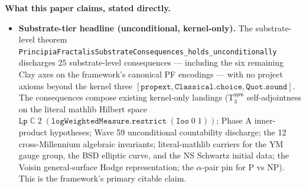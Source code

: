 \documentclass[11pt,a4paper]{amsart}
\theoremstyle{plain}
\theoremstyle{definition}
\begin{document}
\begin{abstract}
Eight typed falsifiers register the empirical or structural observations that would refute the framework; zero are triggered. The substrate's one genuinely pre-registered forward-runnable prediction is a $144$th-problem $\alpha$-pin on graph isomorphism. \textbf{Detailed architecture, axiom status, empirical evidence status, and honest scope of every claim are stated in the framed scope statement immediately following.}
\end{abstract}

\maketitle

\vspace*{-1em}

\begin{framed}
\noindent\textbf{What this paper claims, stated directly.}
\begin{itemize}[itemsep=2pt,leftmargin=1.4em]
\item \textbf{Substrate-tier headline (unconditional, kernel-only).} The substrate-level theorem \texttt{PrincipiaFractalisSubstrateConsequences\_holds\_unconditionally} discharges 25 substrate-level consequences --- including the six remaining Clay axes on the framework's canonical PF encodings --- with no project axioms beyond the kernel three $[\texttt{propext}, \texttt{Classical.choice}, \texttt{Quot.sound}]$. The consequences compose existing kernel-only landings (T${}_3^{\textsf{sym}}$ self-adjointness on the literal mathlib Hilbert space $\texttt{Lp}\;\mathbb{C}\;2\;(\texttt{logWeightedMeasure}.\texttt{restrict}\;(\texttt{Ioo}\;0\;1))$; Phase A inner-product hypotheses; Wave 59 unconditional countability discharge; the 12 cross-Millennium algebraic invariants; literal-mathlib carriers for the YM gauge group, the BSD elliptic curve, and the NS Schwartz initial data; the Voisin general-surface Hodge representation; the $\alpha$-pair pin for P vs NP). This is the framework's primary citable claim.

\end{itemize}
\end{framed}
\end{document}

